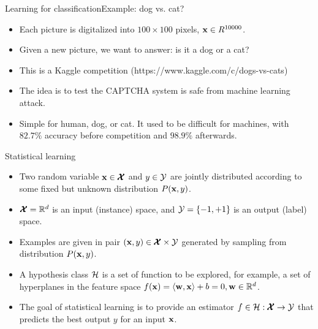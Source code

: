 \documentclass[first=dgreen,second=purple,logo=yellowexc]{aaltoslides}
\begin{document}
{\begin{frame}{Learning for classification}{Example: dog vs. cat?}
\begin{itemize}
\begin{center}
		\end{center}
		\item Each picture is digitalized into $100\times100$ pixels, $\mathbf {x} \in R^{10000}$.
		\item Given a new picture, we want to answer: is it a dog or a cat?
		\item This is a Kaggle competition (https://www.kaggle.com/c/dogs-vs-cats)
		\item The idea is to test the CAPTCHA system is safe from machine learning attack.
		\item Simple for human, dog, or cat. It used to be difficult for machines, with $82.7\%$ accuracy \citep{Golle08machine} before competition and $98.9\%$ afterwards.
	\end{itemize}
\end{frame}

\begin{frame}{Statistical learning}
	\begin{itemize}
		\item Two random variable $\mathbf {x}\in\pmb {\mathcal{X}}$ and $y\in\mathcal{Y}$ are jointly distributed according to some fixed but unknown distribution $P(\mathbf {x},y)$.
		\item $\pmb {\mathcal{X}}=\mathbb{R}^d$ is an input (instance) space, and $\mathcal{Y}=\{-1,+1\}$ is an output (label) space.
		\item Examples are given in pair $(\mathbf {x},y)\in\pmb {\mathcal{X}}\times\mathcal{Y}$ generated by sampling from distribution $P(\mathbf {x},y)$.
		\item A hypothesis class $\mathcal{H}$ is a set of function to be explored, for example, a set of hyperplanes in the feature space $f(\mathbf {x})=\langle \mathbf {w}, \mathbf {x} \rangle+b=0, \mathbf {w}\in\mathbb{R}^d$. 
		\item The goal of statistical learning is to provide an estimator $f\in\mathcal{H}:\pmb {\mathcal{X}}\rightarrow\mathcal{Y}$ that predicts the best output $y$ for an input $\mathbf {x}$. 
	\end{itemize}
\end{frame}


}
\end{document}

